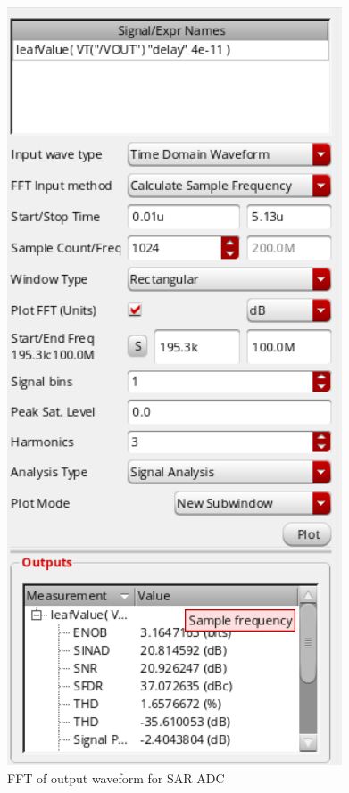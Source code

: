 \documentclass[a4paper,12pt]{article}
\begin{document}
\begin{itemize}
    \begin{figure}[H]
        \centering
        \includegraphics[max width = \textwidth]{3_ENOB_SNR.png}
        \caption{FFT of output waveform for SAR ADC}
        \label{fig:enter-label}
    \end{figure}


\end{itemize}
\end{document}
